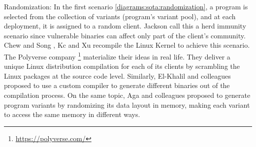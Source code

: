 
\begin{usage}{Randomization:}
    \label{usage:randomization}
    \normalfont
    In the first scenario \autoref{diagrams:sota:randomization}, a program is selected from the collection of variants (program's variant pool), and at each deployment, it is assigned to a random client. 
    Jackson \etal \cite{jackson} call this a herd immunity scenario since vulnerable binaries can affect only part of the client's community. Chew and Song \cite{Chew02mitigatingbuffer}, Kc \etal \cite{Kc03} and Xu \etal \cite{xu2020merr} recompile the Linux Kernel to achieve this scenario. The Polyverse company \footnote{\url{https://polyverse.com/}} materialize their ideas in real life. They deliver a unique Linux distribution compilation for each of its clients by scrambling the Linux packages at the source code level. Similarly, El-Khalil and colleagues \cite{ElKhalil2004} proposed to use a custom compiler to generate different binaries out of the compilation process. 
    On the same topic, Aga and colleagues \cite{aga2019smokestack} proposed to generate program variants by randomizing its data layout in memory, making each variant to access the same memory in different ways. 

    
    
\end{usage}

